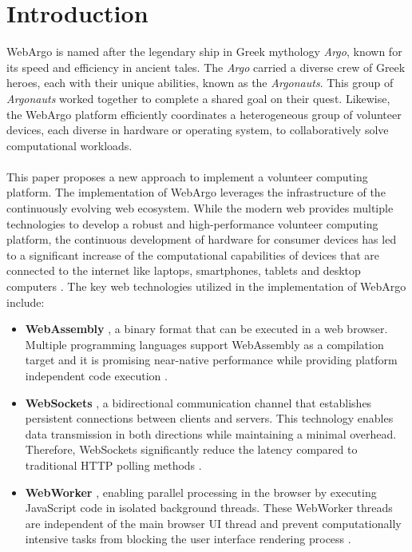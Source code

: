 \chapter{Introduction}
\label{ch:intro}
WebArgo is named after the legendary ship in Greek mythology \emph{Argo}, known for its speed and efficiency in ancient tales. The \emph{Argo} carried a diverse crew of Greek heroes, each with their unique abilities, known as the \emph{Argonauts}. This group of \emph{Argonauts} worked together to complete a shared goal on their quest. Likewise, the WebArgo platform efficiently coordinates a heterogeneous group of volunteer devices, each diverse in hardware or operating system, to collaboratively solve computational workloads.
\\~\\
This paper proposes a new approach to implement a volunteer computing platform. The implementation of WebArgo leverages the infrastructure of the continuously evolving web ecosystem. While the modern web provides multiple technologies to develop a robust and high-performance volunteer computing platform, the continuous development of hardware for consumer devices has led to a significant increase of the computational capabilities of devices that are connected to the internet like laptops, smartphones, tablets and desktop computers \cite{relatedwork:mobilecloud, relatedwork:wasmedgecomputing}. The key web technologies utilized in the implementation of WebArgo include:
\begin{itemize}
    \item \textbf{WebAssembly} \cite{methodology:wasmW3C}, a binary format that can be executed in a web browser. Multiple programming languages support WebAssembly as a compilation target and it is promising near-native performance while providing platform independent code execution \cite{methodology:wasm, methodology:wasmW3C}.
    \item \textbf{WebSockets} \cite{methodology:websockets1}, a bidirectional communication channel that establishes persistent connections between clients and servers. This technology enables data transmission in both directions while maintaining a minimal overhead. Therefore, WebSockets significantly reduce the latency compared to traditional \acs{HTTP} polling methods \cite{methodology:websockets3}. 
    \item \textbf{WebWorker} \cite{methodology:webworkers}, enabling parallel processing in the browser by executing JavaScript code in isolated background threads. These WebWorker threads are independent of the main browser \ac{UI} thread and prevent computationally intensive tasks from blocking the user interface rendering process \cite{methodology:webworkers}.
\end{itemize}
